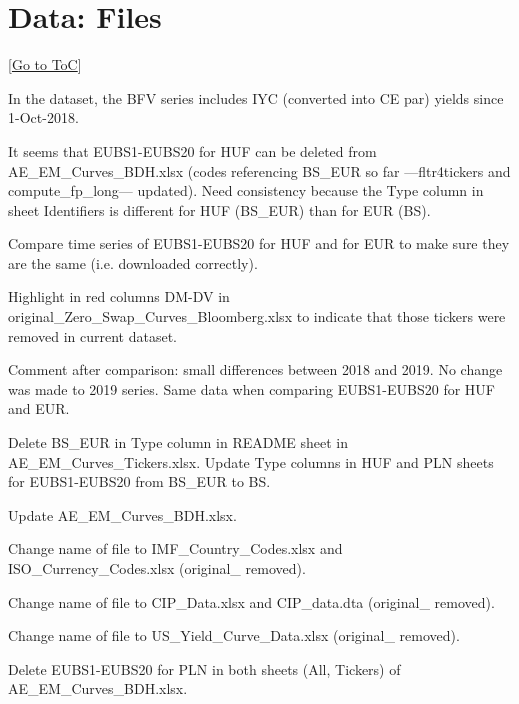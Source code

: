 \documentclass[12pt]{article}
\newcommand{\gototoc}{\vspace{-1.8cm} \null\hfill [\hyperlink{toc}{Go to ToC}] \newline}
\newcommand{\cmark}{\ding{51}}
\newcommand{\done}{\rlap{$\square$}{\raisebox{2pt}{\large\hspace{1pt}\cmark}}%
	\hspace{-2.5pt}}
\begin{document}
\section{Data: Files}
\gototoc
\begin{todolist}
	\item[\done] In the dataset, the BFV series includes IYC (converted into CE par) yields since 1-Oct-2018. 
	\item[\done] It seems that EUBS1-EUBS20 for HUF can be deleted from AE_EM_Curves_BDH.xlsx (codes referencing BS_EUR so far ---fltr4tickers and compute_fp_long--- updated). Need consistency because the Type column in sheet Identifiers is different for HUF (BS_EUR) than for EUR (BS). 
	\begin{todolist}
		\item[\done] Compare time series of EUBS1-EUBS20 for HUF and for EUR to make sure they are the same (i.e. downloaded correctly).
		\item[\done] Highlight in red columns DM-DV in original_Zero_Swap_Curves_Bloomberg.xlsx to indicate that those tickers were removed in current dataset.
		\item[\done] Comment after comparison: small differences between 2018 and 2019. No change was made to 2019 series. Same data when comparing EUBS1-EUBS20 for HUF and EUR.
		\item[\done] Delete BS_EUR in Type column in README sheet in AE_EM_Curves_Tickers.xlsx. Update Type columns in HUF and PLN sheets for EUBS1-EUBS20 from BS_EUR to BS.
		\item[\done] Update AE_EM_Curves_BDH.xlsx.
	\end{todolist}
	\item[\done] Change name of file to IMF_Country_Codes.xlsx and ISO_Currency_Codes.xlsx (original_ removed).
	\item[\done] Change name of file to CIP_Data.xlsx and CIP_data.dta (original_ removed).
	\item[\done] Change name of file to US_Yield_Curve_Data.xlsx (original_ removed).
	\item[\done] Delete EUBS1-EUBS20 for PLN in both sheets (All, Tickers) of AE_EM_Curves_BDH.xlsx.
\end{todolist}
\end{document}
